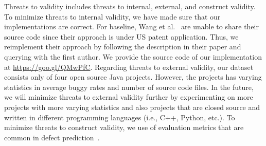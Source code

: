 Threats to validity includes threats to internal, external, and construct validity. To minimize threats to internal validity, we have made sure that our implementations are correct. 
For baseline, Wang et al.~\cite{wang2016automatically} are unable to share their source code since their approach is under US patent application. Thus, we reimplement their approach by following the description in their paper and querying with the first author. We provide the source code of our implementation at \url{https://goo.gl/QMwPfC}. 
Regarding threats to external validity, our dataset consists only of four open source Java projects. However, the projects has varying statistics in average buggy rates and number of source code files. In the future, we will minimize threats to external validity further by experimenting on more projects with more varying statistics and also projects that are closed source and written in different programming languages (i.e., C++, Python, etc.). To minimize threats to construct validity, we use of evaluation metrics that are common in defect prediction~\cite{nam2013transfer}.
